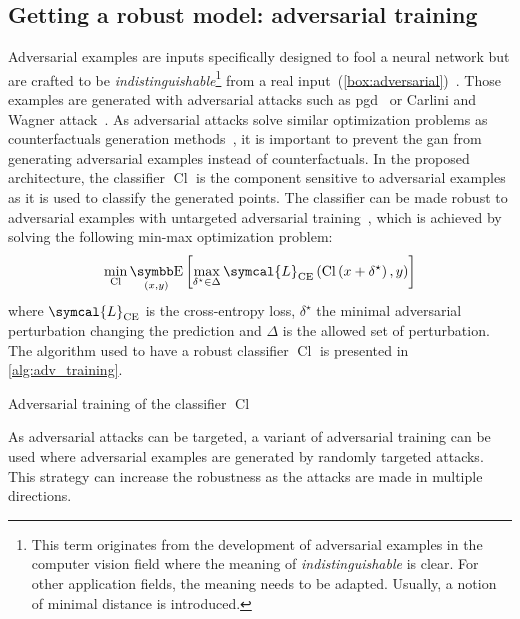 \documentclass[../main.tex]{subfiles}
\begin{document}
	\subsection{Getting a robust model: adversarial training}
		Adversarial examples are inputs specifically designed to fool a neural network but are crafted to be \emph{indistinguishable}\footnote{This term originates from the development of adversarial examples in the computer vision field where the meaning of \emph{indistinguishable} is clear.
			For other application fields, the meaning needs to be adapted.
			Usually, a notion of minimal distance is introduced.} from a real input~(\cref{box:adversarial})~\cite{Szegedy2013IntriguingPO}.
		Those examples are generated with adversarial attacks such as \gls{pgd}~\cite{PGDAttacks2} or Carlini and Wagner attack~\cite{Carlini2016TowardsET}.
		As adversarial attacks solve similar optimization problems as counterfactuals generation methods~\cite{Pawelczyk2021ExploringCE,Freiesleben2021}, it is important to prevent the \gls{gan} from generating adversarial examples instead of counterfactuals.
		In the proposed architecture, the classifier \(\operatorname{Cl}\) is the component sensitive to adversarial examples as it is used to classify the generated points.
		The classifier can be made robust to adversarial examples with untargeted adversarial training~\cite{AdvTrainingMinMax}, which is achieved by solving the following min-max optimization problem:
		\begin{equation}
			\min_{\operatorname{Cl}} \E_{(x,y)}\left[\max_{\delta^{\star} \in \Delta} \symcal{L}_{\text{CE}}\left(\operatorname{Cl}\left(x+\delta^{\star}\right), y \right)  \right]
		\end{equation}
		where \(\symcal{L}_{\text{CE}}\) is the cross-entropy loss, \(\delta^{\star}\) the minimal adversarial perturbation changing the prediction and \(\Delta\) is the allowed set of perturbation.
		The algorithm used to have a robust classifier \(\operatorname{Cl}\) is presented in \cref{alg:adv_training}.
		\begin{algorithm}[htbp]
			\DontPrintSemicolon
			\caption{Adversarial training of the classifier \(\operatorname{Cl}\)}\label{alg:adv_training}
		\end{algorithm}
		As adversarial attacks can be targeted, a variant of adversarial training can be used where adversarial examples are generated by randomly targeted attacks.
		This strategy can increase the robustness as the attacks are made in multiple directions.
\end{document}
